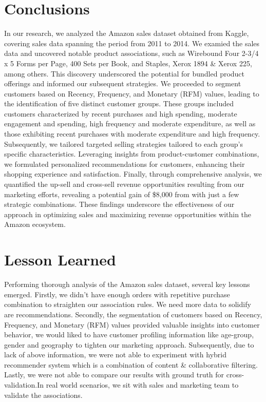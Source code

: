 \documentclass[11pt]{article} %
\begin{document}
\section{Conclusions}
In our research, we analyzed the Amazon sales dataset obtained from Kaggle, covering sales data spanning the period from 2011 to 2014. We examied the sales data and uncovered notable product associations, such as Wirebound Four 2-3/4 x 5 Forms per Page, 400 Sets per Book, and Staples, Xerox 1894 \& Xerox 225, among others. This discovery underscored the potential for bundled product offerings and informed our subsequent strategies. We proceeded to segment customers based on Recency, Frequency, and Monetary (RFM) values, leading to the identification of five distinct customer groups. These groups included customers characterized by recent purchases and high spending, moderate engagement and spending, high frequency and moderate expenditure, as well as those exhibiting recent purchases with moderate expenditure and high frequency. Subsequently, we tailored targeted selling strategies tailored to each group's specific characteristics. Leveraging insights from product-customer combinations, we formulated personalized recommendations for customers, enhancing their shopping experience and satisfaction. Finally, through comprehensive analysis, we quantified the up-sell and cross-sell revenue opportunities resulting from our marketing efforts, revealing a potential gain of \$8,000 from with just a few strategic combinations. These findings underscore the effectiveness of our approach in optimizing sales and maximizing revenue opportunities within the Amazon ecosystem.
\section{Lesson Learned}
Performing thorough analysis of the Amazon sales dataset, several key lessons emerged. Firstly, we didn't have enough orders with repetitive purchase combination to straighten our association rules. We need more data to solidify are recommendations. Secondly, the segmentation of customers based on Recency, Frequency, and Monetary (RFM) values provided valuable insights into customer behavior, we would liked to have customer profiling information like age-group, gender and geography to tighten our marketing approach.
Subsequently, due to lack of above information, we were not able to experiment with hybrid recommender system which is a combination of content \& collaborative filtering.
Lastly, we were not able to compare our results with ground truth for cross-validation.In real world scenarios, we sit with sales and marketing team to validate the associations.
\end{document}
